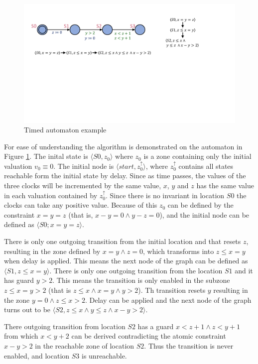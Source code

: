 \begin{figure} 
	\centering
	\includegraphics[width=.7\textwidth]{include/figures/splitexample_aut}
	\caption{Timed automaton example}
	\label{fig:splitex}
\end{figure}

For ease of understanding the algorithm is demonstrated on the automaton in Figure \ref{fig:splitex}. The inital state is  $\langle S0, z_0 \rangle$ where $z_0$ is a zone containing only the initial valuation $v_0 \equiv 0$. The initial node is  $\langle start, z_0^\uparrow  \rangle$, where $z_0^\uparrow$ contains all states reachable form the initial state by delay. Since as time passes, the values of the three clocks will be incremented by the same value, $x$, $y$ and $z$ has the same value in each valuation contained by $z_0^\uparrow$. Since there is no invariant in location $S0$ the clocks can take any positive value. Because of this $z_0$ can be defined by the constraint $x=y=z$ (that is, $x-y = 0 \wedge y-z=0 $), and the initial node can be defined as $\langle S0; x=y=z  \rangle$.

There is only one outgoing transition from the initial location and that resets $z$, resulting in the zone defined by $x=y \wedge z=0$, which transforms into $z \leq x=y$ when delay is applied. This means the next node of the graph can be defined as $\langle S1, z \leq x=y \rangle$. There is only one outgoing transition from the location $S1$ and it has guard $y>2$. This means the transition is only enabled in the subzone $z \leq x=y>2$ (that is $z \leq x \wedge x=y \wedge y>2$). Th transition resets $y$ resulting in the zone $y=0 \wedge z \leq x > 2$. Delay can be applied and the next node of the graph turns out to be $\langle S2, z \leq x \wedge y \leq z \wedge x-y>2 \rangle$.

There outgoing transition from location $S2$ has a guard $x<z+1 \wedge z<y+1$ from which $x<y+2$ can be derived contradicting the atomic constraint $x-y>2$ in the reachable zone of location $S2$. Thus the transition is never enabled, and location $S3$ is unreachable.  

